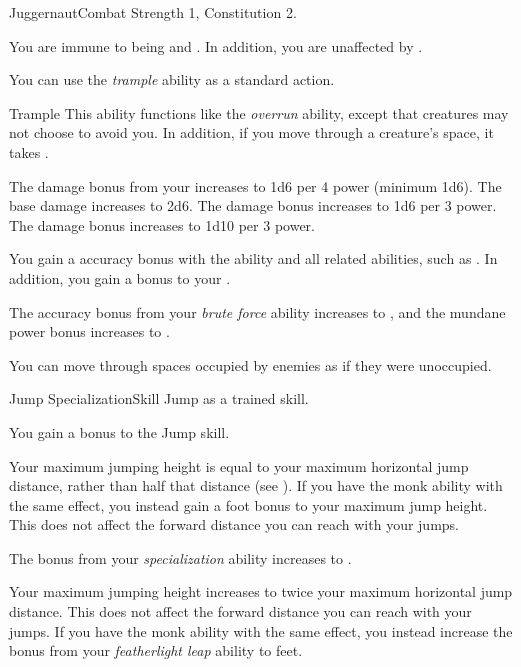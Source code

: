     \begin{feat}{Juggernaut}{Combat}
        \featpre Strength 1, Constitution 2.

         You are immune to being \slowed and \immobilized.
        In addition, you are unaffected by .

         You can use the \textit{trample} ability as a standard action.
        \begin{ability}{Trample}
            This ability functions like the \textit{overrun} ability, except that creatures may not choose to avoid you.
            In addition, if you move through a creature's space, it takes .

            \rankline
             The damage bonus from your  increases to 1d6 per 4 power (minimum 1d6).
             The base damage increases to 2d6.
             The damage bonus increases to 1d6 per 3 power.
             The damage bonus increases to 1d10 per 3 power.
        \end{ability}

         You gain a  accuracy bonus with the  ability and all related abilities, such as .
        In addition, you gain a  bonus to your .

         The accuracy bonus from your \textit{brute force} ability increases to , and the mundane power bonus increases to .

         You can move through spaces occupied by enemies as if they were unoccupied.
    \end{feat}

    \begin{feat}{Jump Specialization}{Skill}
        \featpre Jump as a trained skill.

         You gain a  bonus to the Jump skill.

         Your maximum jumping height is equal to your maximum horizontal jump distance, rather than half that distance (see ).
        If you have the  monk ability with the same effect, you instead gain a  foot bonus to your maximum jump height.
        This does not affect the forward distance you can reach with your jumps.

         The bonus from your \textit{specialization} ability increases to .

         Your maximum jumping height increases to twice your maximum horizontal jump distance.
        This does not affect the forward distance you can reach with your jumps.
        If you have the  monk ability with the same effect, you instead increase the bonus from your \textit{featherlight leap} ability to  feet.
    \end{feat}


